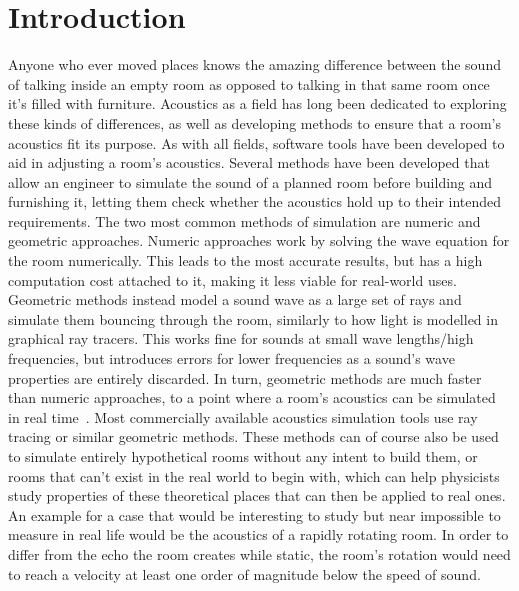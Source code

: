\chapter{Introduction}

Anyone who ever moved places knows the amazing difference between the sound of talking inside an empty room
as opposed to talking in that same room once it's filled with furniture.
Acoustics as a field has long been dedicated to exploring these kinds of differences,
as well as developing methods to ensure that a room's acoustics fit its purpose.
\newline
As with all fields, software tools have been developed to aid in adjusting a room's acoustics.
Several methods have been developed that allow an engineer to simulate the sound of a planned room before building and furnishing it,
letting them check whether the acoustics hold up to their intended requirements.
\newline
The two most common methods of simulation are numeric and geometric approaches.
Numeric approaches work by solving the wave equation for the room numerically.
This leads to the most accurate results, but has a high computation cost attached to it,
making it less viable for real-world uses.
\newline
Geometric methods instead model a sound wave as a large set of rays
and simulate them bouncing through the room,
similarly to how light is modelled in graphical ray tracers.
This works fine for sounds at small wave lengths/high frequencies,
but introduces errors for lower frequencies as a sound's wave properties are entirely discarded.
In turn, geometric methods are much faster than numeric approaches,
to a point where a room's acoustics can be simulated in real time~\cite{Cha08}.
Most commercially available acoustics simulation tools use ray tracing or similar geometric methods.
\newline
These methods can of course also be used to simulate entirely hypothetical rooms without any intent to build them,
or rooms that can't exist in the real world to begin with,
which can help physicists study properties of these theoretical places that can then be applied to real ones.
\newline
An example for a case that would be interesting to study but near impossible to measure in real life
would be the acoustics of a rapidly rotating room.
In order to differ from the echo the room creates while static,
the room's rotation would need to reach a velocity at least one order of magnitude below the speed of sound.
